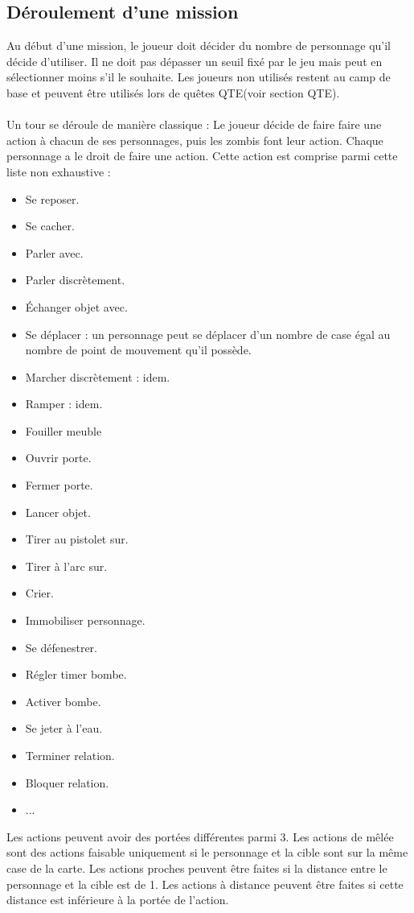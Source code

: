 \subsection{Déroulement d'une mission}
Au début d'une mission, le joueur doit décider du nombre de personnage qu'il décide d'utiliser. Il ne doit pas dépasser un seuil fixé par le jeu mais peut en sélectionner moins s'il le souhaite. Les joueurs non utilisés restent au camp de base et peuvent être utilisés lors de quêtes QTE(voir section QTE).
\\\\
Un tour se déroule de manière classique : Le joueur décide de faire faire une action à chacun de ses personnages, puis les zombis font leur action. Chaque personnage a le droit de faire une action. Cette action est comprise parmi cette liste non exhaustive :
\begin{itemize}
  \item Se reposer.
  \item Se cacher.
  \item Parler avec.
  \item Parler discrètement.
  \item Échanger objet avec.
  \item Se déplacer : un personnage peut se déplacer d'un nombre de case égal au nombre de point de mouvement qu'il possède.
  \item Marcher discrètement : idem.
  \item Ramper : idem.
  \item Fouiller meuble
  \item Ouvrir porte.
  \item Fermer porte.
  \item Lancer objet.
  \item Tirer au pistolet sur.
  \item Tirer à l'arc sur.
  \item Crier.
  \item Immobiliser personnage.
  \item Se défenestrer.
  \item Régler timer bombe.
  \item Activer bombe.
  \item Se jeter à l'eau.
  \item Terminer relation.
  \item Bloquer relation.
  \item ...
\end{itemize}
Les actions peuvent avoir des portées différentes parmi 3. Les actions de mêlée sont des actions faisable uniquement si le personnage et la cible sont sur la même case de la carte. Les actions proches peuvent être faites si la distance entre le personnage et la cible est de 1. Les actions à distance peuvent être faites si cette distance est inférieure à la portée de l'action.
